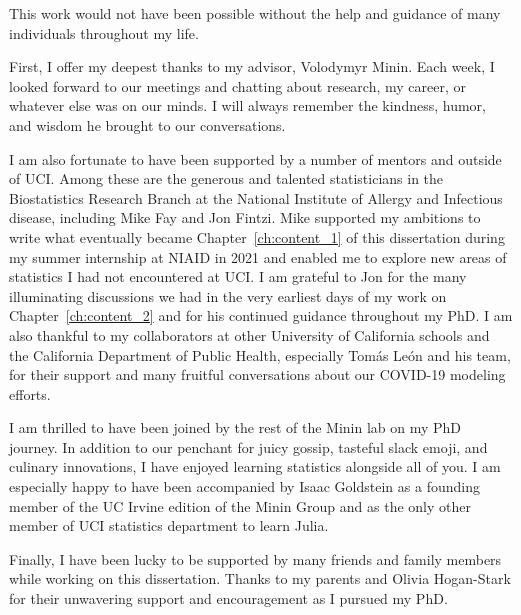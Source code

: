 \acknowledgments
{



This work would not have been possible without the help and guidance of many individuals throughout my life.

First, I offer my deepest thanks to my advisor, Volodymyr Minin.
Each week, I looked forward to our meetings and chatting about research, my career, or whatever else was on our minds. 
I will always remember the kindness, humor, and wisdom he brought to our conversations.

I am also fortunate to have been supported by a number of mentors and  outside of UCI.
Among these are the generous and talented statisticians in the Biostatistics Research Branch at the National Institute of Allergy and Infectious disease, including Mike Fay and Jon Fintzi.
Mike supported my ambitions to write what eventually became Chapter~\ref{ch:content_1} of this dissertation during my summer internship at NIAID in 2021 and enabled me to explore new areas of statistics I had not encountered at UCI.
I am grateful to Jon for the many illuminating discussions we had in the very earliest days of my work on Chapter~\ref{ch:content_2} and for his continued guidance throughout my PhD.
I am also thankful to my collaborators at other University of California schools and the California Department of Public Health, especially Tom\'{a}s Le\'{o}n and his team, for their support and many fruitful conversations about our COVID-19 modeling efforts.

I am thrilled to have been joined by the rest of the Minin lab on my PhD journey.
In addition to our penchant for juicy gossip, tasteful slack emoji, and culinary innovations, I have enjoyed learning statistics alongside all of you.
I am especially happy to have been accompanied by Isaac Goldstein as a founding member of the UC Irvine edition of the Minin Group and as the only other member of UCI statistics department to learn Julia.

Finally, I have been lucky to be supported by many friends and family members while working on this dissertation.
Thanks to my parents and Olivia Hogan-Stark for their unwavering support and encouragement as I pursued my PhD.

}
